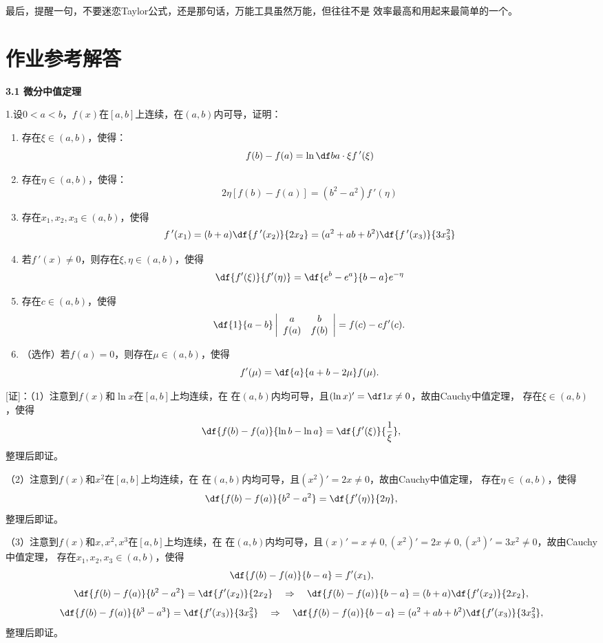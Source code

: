 最后，提醒一句，不要迷恋Taylor公式，还是那句话，万能工具虽然万能，但往往不是
效率最高和用起来最简单的一个。

\newpage

\section*{作业参考解答}

\begin{center}
	\bf 3.1 微分中值定理
\end{center}

\bigskip

1.设$0<a<b$，$f(x)$在$[a,b]$上连续，在$(a,b)$内可导，证明：
\begin{enumerate}[(1)]
  \setlength{\itemindent}{1cm}
  \item 存在$\xi\in(a,b)$，使得：
	$$f(b)-f(a)=\ln\df ba\cdot \xi f\,'(\xi)$$
  \item 存在$\eta\in(a,b)$，使得：
    $$2\eta[f(b)-f(a)]=(b^2-a^2)f\,'(\eta)$$
  \item 存在$x_1,x_2,x_3\in(a,b)$，使得
	$$f\,'(x_1)=(b+a)\df{f\,'(x_2)}{2x_2}=(a^2+ab+b^2)
	\df{f\,'(x_3)}{3x_3^2}$$ 
  \item 若$f\,'(x)\ne 0$，则存在$\xi,\eta\in(a,b)$，使得
	$$\df{f'(\xi)}{f'(\eta)}=\df{e^b-e^a}{b-a}e^{-\eta}$$
  \item 存在$c\in(a,b)$，使得
	$$\df{1}{a-b}\left|\begin{array}{cc}
	a & b\\ f(a) & f(b)
	\end{array}\right|=f(c)-cf'(c).$$
  \item （选作）若$f(a)=0$，则存在$\mu\in(a,b)$，使得
  $$f'(\mu)=\df{a}{a+b-2\mu}f(\mu).$$
\end{enumerate}

[证]：（1）注意到$f(x)$和$\ln x$在$[a,b]$上均连续，在
在$(a,b)$内均可导，且$(\ln x)'=\df1x\ne 0$，故由Cauchy中值定理，
存在$\xi\in(a,b)$，使得
$$\df{f(b)-f(a)}{\ln b-\ln a}=\df{f'(\xi)}{\frac1{\xi}},$$
整理后即证。

（2）注意到$f(x)$和$x^2$在$[a,b]$上均连续，在
在$(a,b)$内均可导，且$(x^2)'=2x\ne 0$，故由Cauchy中值定理，
存在$\eta\in(a,b)$，使得
$$\df{f(b)-f(a)}{b^2-a^2}=\df{f'(\eta)}{2\eta},$$
整理后即证。

（3）注意到$f(x)$和$x,x^2,x^3$在$[a,b]$上均连续，在
在$(a,b)$内均可导，且$(x)'=x\ne 0,(x^2)'=2x\ne 0,
(x^3)'=3x^2\ne 0$，故由Cauchy中值定理，
存在$x_1,x_2,x_3\in(a,b)$，使得
$$\df{f(b)-f(a)}{b-a}=f'(x_1),$$
$$\df{f(b)-f(a)}{b^2-a^2}=\df{f'(x_2)}{2x_2}
\quad\Rightarrow\quad
\df{f(b)-f(a)}{b-a}=(b+a)\df{f'(x_2)}{2x_2},$$
$$\df{f(b)-f(a)}{b^3-a^3}=\df{f'(x_3)}{3x_3^2}
\quad\Rightarrow\quad
\df{f(b)-f(a)}{b-a}=(a^2+ab+b^2)\df{f'(x_3)}{3x_3^2},$$
整理后即证。

